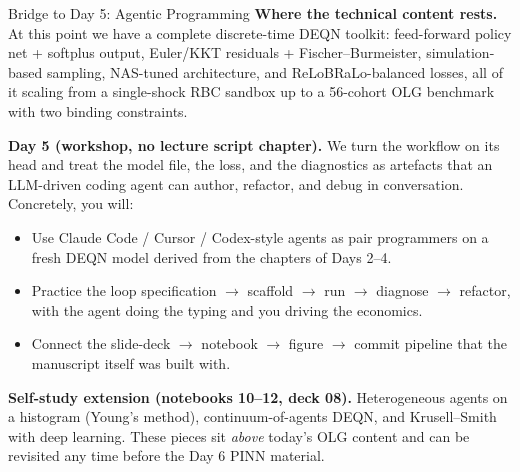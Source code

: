 \documentclass[aspectratio=169,11pt]{beamer}
\newcommand{\emphc}[1]{\textcolor{harvardcrimson}{#1}}
\begin{document}
\begin{frame}{Bridge to Day 5: Agentic Programming}
\footnotesize
\textbf{Where the technical content rests.}  At this point we have a complete discrete-time DEQN toolkit: feed-forward policy net + softplus output, Euler/KKT residuals + Fischer--Burmeister, simulation-based sampling, NAS-tuned architecture, and ReLoBRaLo-balanced losses, all of it scaling from a single-shock RBC sandbox up to a 56-cohort OLG benchmark with two binding constraints.

\vspace{0.4em}
\textbf{Day 5 (workshop, no lecture script chapter).}  We turn the workflow on its head and treat the model file, the loss, and the diagnostics as artefacts that an LLM-driven coding agent can author, refactor, and debug in conversation.  Concretely, you will:
\begin{itemize}\itemsep1pt
    \item Use Claude Code / Cursor / Codex-style agents as pair programmers on a fresh DEQN model derived from the chapters of Days 2--4.
    \item Practice the loop \emphc{specification $\to$ scaffold $\to$ run $\to$ diagnose $\to$ refactor}, with the agent doing the typing and you driving the economics.
    \item Connect the slide-deck $\to$ notebook $\to$ figure $\to$ commit pipeline that the manuscript itself was built with.
\end{itemize}

\vspace{0.4em}
\textbf{Self-study extension (notebooks 10--12, deck 08).}  Heterogeneous agents on a histogram (Young's method), continuum-of-agents DEQN, and Krusell--Smith with deep learning.  These pieces sit \emph{above} today's OLG content and can be revisited any time before the Day 6 PINN material.
\end{frame}
\end{document}
